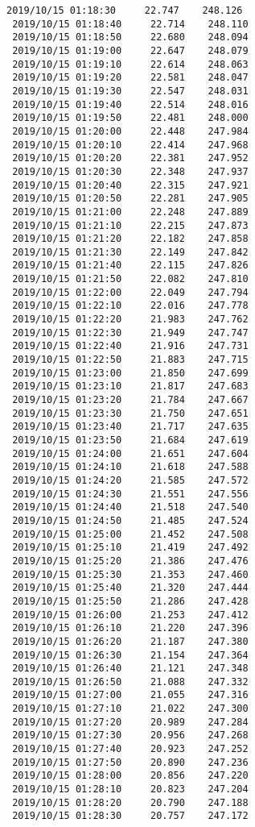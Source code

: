 \documentclass[11pt]{article}
\begin{document}
\begin{Verbatim}[commandchars=\\\{\}]
 2019/10/15 01:18:30     22.747    248.126
 2019/10/15 01:18:40     22.714    248.110
 2019/10/15 01:18:50     22.680    248.094
 2019/10/15 01:19:00     22.647    248.079
 2019/10/15 01:19:10     22.614    248.063
 2019/10/15 01:19:20     22.581    248.047
 2019/10/15 01:19:30     22.547    248.031
 2019/10/15 01:19:40     22.514    248.016
 2019/10/15 01:19:50     22.481    248.000
 2019/10/15 01:20:00     22.448    247.984
 2019/10/15 01:20:10     22.414    247.968
 2019/10/15 01:20:20     22.381    247.952
 2019/10/15 01:20:30     22.348    247.937
 2019/10/15 01:20:40     22.315    247.921
 2019/10/15 01:20:50     22.281    247.905
 2019/10/15 01:21:00     22.248    247.889
 2019/10/15 01:21:10     22.215    247.873
 2019/10/15 01:21:20     22.182    247.858
 2019/10/15 01:21:30     22.149    247.842
 2019/10/15 01:21:40     22.115    247.826
 2019/10/15 01:21:50     22.082    247.810
 2019/10/15 01:22:00     22.049    247.794
 2019/10/15 01:22:10     22.016    247.778
 2019/10/15 01:22:20     21.983    247.762
 2019/10/15 01:22:30     21.949    247.747
 2019/10/15 01:22:40     21.916    247.731
 2019/10/15 01:22:50     21.883    247.715
 2019/10/15 01:23:00     21.850    247.699
 2019/10/15 01:23:10     21.817    247.683
 2019/10/15 01:23:20     21.784    247.667
 2019/10/15 01:23:30     21.750    247.651
 2019/10/15 01:23:40     21.717    247.635
 2019/10/15 01:23:50     21.684    247.619
 2019/10/15 01:24:00     21.651    247.604
 2019/10/15 01:24:10     21.618    247.588
 2019/10/15 01:24:20     21.585    247.572
 2019/10/15 01:24:30     21.551    247.556
 2019/10/15 01:24:40     21.518    247.540
 2019/10/15 01:24:50     21.485    247.524
 2019/10/15 01:25:00     21.452    247.508
 2019/10/15 01:25:10     21.419    247.492
 2019/10/15 01:25:20     21.386    247.476
 2019/10/15 01:25:30     21.353    247.460
 2019/10/15 01:25:40     21.320    247.444
 2019/10/15 01:25:50     21.286    247.428
 2019/10/15 01:26:00     21.253    247.412
 2019/10/15 01:26:10     21.220    247.396
 2019/10/15 01:26:20     21.187    247.380
 2019/10/15 01:26:30     21.154    247.364
 2019/10/15 01:26:40     21.121    247.348
 2019/10/15 01:26:50     21.088    247.332
 2019/10/15 01:27:00     21.055    247.316
 2019/10/15 01:27:10     21.022    247.300
 2019/10/15 01:27:20     20.989    247.284
 2019/10/15 01:27:30     20.956    247.268
 2019/10/15 01:27:40     20.923    247.252
 2019/10/15 01:27:50     20.890    247.236
 2019/10/15 01:28:00     20.856    247.220
 2019/10/15 01:28:10     20.823    247.204
 2019/10/15 01:28:20     20.790    247.188
 2019/10/15 01:28:30     20.757    247.172

\end{Verbatim}
\end{document}
